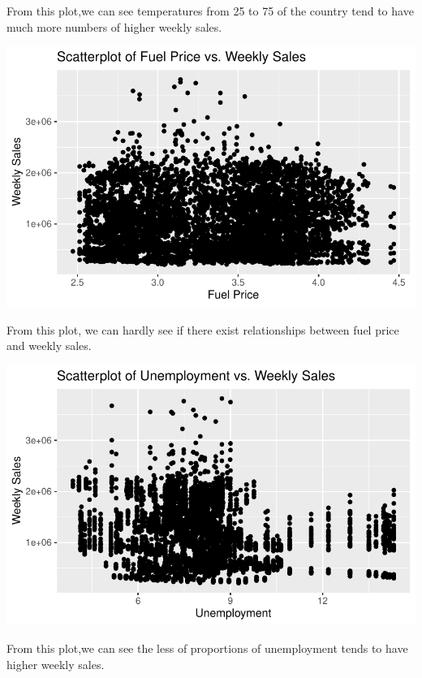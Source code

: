 \documentclass[
  letterpaper,
  DIV=11,
  numbers=noendperiod]{scrartcl}
\begin{document}
From this plot,we can see temperatures from 25 to 75 of the country tend
to have much more numbers of higher weekly sales.

\includegraphics{678final_files/figure-pdf/unnamed-chunk-20-1.pdf}

From this plot, we can hardly see if there exist relationships between
fuel price and weekly sales.

\includegraphics{678final_files/figure-pdf/unnamed-chunk-21-1.pdf}

From this plot,we can see the less of proportions of unemployment tends
to have higher weekly sales.
\end{document}

